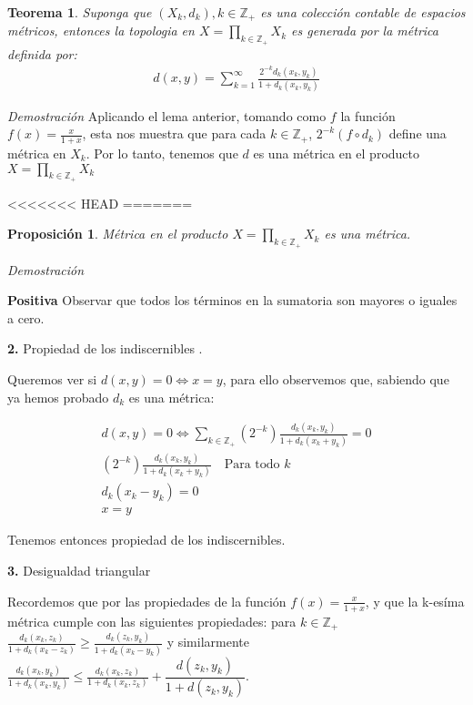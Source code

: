 \documentclass[]{article}
\newtheorem{thm}{Teorema}
\newtheorem{prop}{Proposición}
\newcommand{\lrp}[1]{\left( #1 \right)}
\newcommand{\ZZ}{\mathbb{Z}}
\newcommand{\qt}[1]{\textrm{#1}}
\begin{document}
\begin{thm}
	Suponga que $ (X_k,d_k), k \in \ZZ_+ $ es una colección  contable de espacios métricos, entonces la topologia en $ X = \prod_{k \in \ZZ_+}^{} X_k $ es generada por la métrica definida por:
	\begin{align} \label{newmetric}
	d(x,y) = \sum_{k =1}^{\infty} \frac{2^{-k} d_k(x_k,y_k)}{1 + d_k(x_k,y_k)}  
	\end{align} 
\end{thm}

\textit{Demostración} Aplicando el lema anterior, tomando como $f$ la función $f(x) = \frac{x}{1+x} $, esta nos muestra que para cada $ k \in \ZZ_+ $, $ 2^{-k}(f \circ d_k) $ define una métrica en $ X_k $. Por lo tanto, tenemos que $ d $ es una métrica en el producto $ X = \prod_{k \in \ZZ_+}^{}X_k $

<<<<<<< HEAD
=======
\begin{prop}
Métrica en el producto $ X = \prod_{k \in \ZZ_+}^{}X_k $ es una métrica.
\end{prop}

\textit{Demostración}

\textbf{Positiva}
Observar que todos los términos en la sumatoria son mayores o iguales a cero. 

\textbf{2.} Propiedad de los indiscernibles .

Queremos ver si $ d(x,y) = 0 \iff x = y $, para ello observemos que, sabiendo que ya hemos probado $ d_k $ es una métrica:

\begin{align*}
d(x,y) = 0 \iff \sum_{k \in \ZZ_+} \lrp{2^{-k}} \frac{d_k(x_k,y_k)}{1 + d_k(x_k+y_k)} = 0  \\
\lrp{2^{-k}} \frac{d_k(x_k,y_k)}{1 + d_k(x_k+y_k)} \quad \qt{Para todo } k\\
d_k(x_k - y_k) = 0 \\
x = y
\end{align*}

Tenemos entonces propiedad de los indiscernibles.

\textbf{3.} Desigualdad triangular

Recordemos que por las propiedades de la función $ f(x) = \frac{x}{1+x} $, y que la k-esíma métrica cumple con las siguientes propiedades: para $k \in \ZZ_+ $ $ \frac{d_k(x_k,z_k)}{1+ d_k(x_k - z_k)} \geq \frac{d_k(z_k,y_k)}{1 + d_k(x_k - y_k)} $ y similarmente $ \frac{d_k(x_k,y_k)}{1 + d_k(x_k,y_k)} \leq \frac{d_k(x_k,z_k)}{1 + d_k(x_k,z_k)} + \dfrac{d(z_k,y_k)}{1 + d(z_k,y_k)}  $.
\end{document}
